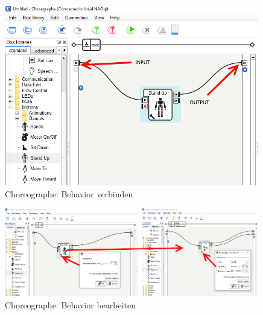 \begin{appendix}
        \begin{figure}[ht]
            \centering
            \includegraphics[width=0.99\textwidth]{src/pictures/nao-choreo-connect.png}
            \caption{Choreographe: Behavior verbinden}
            \label{img:nao:choreo:connect}
        \end{figure}

        \begin{figure}[ht]
            \centering
            \includegraphics[width=0.99\textwidth]{src/pictures/nao-choreo-options.png}
            \caption{Choreographe: Behavior bearbeiten}
            \label{img:nao:choreo:options}
        \end{figure}

        \cleardoubleemptypage


\end{appendix}
